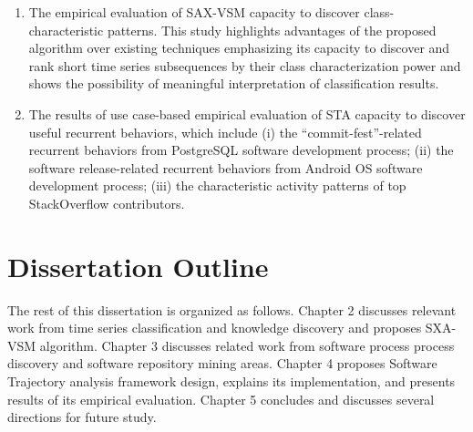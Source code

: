 \begin{enumerate}
\begin{enumerate}
 \item The empirical evaluation of SAX-VSM capacity to discover class-characteristic patterns.
This study highlights advantages of the proposed algorithm over existing techniques 
emphasizing
its capacity to discover and rank short time series subsequences by their class 
characterization power and 
shows the possibility of meaningful interpretation of classification results.
 \item The results of use case-based empirical evaluation of STA capacity to discover useful recurrent 
behaviors, which include 
(i) the ``commit-fest''-related recurrent behaviors from PostgreSQL software development process; 
(ii) the software release-related recurrent behaviors from Android OS software development process;
(iii) the characteristic activity patterns of top StackOverflow contributors.
\end{enumerate}

\end{enumerate}

\section{Dissertation Outline}\label{section_organization}
The rest of this dissertation is organized as follows. 
Chapter 2 discusses relevant work from time series classification and knowledge discovery and proposes SXA-VSM algorithm.
Chapter 3 discusses related work from software process process discovery and software repository mining areas.
Chapter 4 proposes Software Trajectory analysis framework design, explains its implementation, and presents results of its empirical evaluation. 
Chapter 5 concludes and discusses several directions for future study.